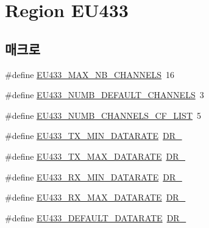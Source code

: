 \hypertarget{group___r_e_g_i_o_n_e_u433}{}\section{Region E\+U433}
\label{group___r_e_g_i_o_n_e_u433}
\subsection*{매크로}
\begin{DoxyCompactItemize}
\item 
\#define \mbox{\hyperlink{group___r_e_g_i_o_n_e_u433_ga800fbd07b871c93758364a0311b87937}{E\+U433\+\_\+\+M\+A\+X\+\_\+\+N\+B\+\_\+\+C\+H\+A\+N\+N\+E\+LS}}~16
\item 
\#define \mbox{\hyperlink{group___r_e_g_i_o_n_e_u433_ga5458d9fd6043a733e6a28f5f30ace167}{E\+U433\+\_\+\+N\+U\+M\+B\+\_\+\+D\+E\+F\+A\+U\+L\+T\+\_\+\+C\+H\+A\+N\+N\+E\+LS}}~3
\item 
\#define \mbox{\hyperlink{group___r_e_g_i_o_n_e_u433_ga97fb06ddf8a39eba531d145336aa7b5f}{E\+U433\+\_\+\+N\+U\+M\+B\+\_\+\+C\+H\+A\+N\+N\+E\+L\+S\+\_\+\+C\+F\+\_\+\+L\+I\+ST}}~5
\item 
\#define \mbox{\hyperlink{group___r_e_g_i_o_n_e_u433_ga800fe5b0107ad06f0938c226022b436b}{E\+U433\+\_\+\+T\+X\+\_\+\+M\+I\+N\+\_\+\+D\+A\+T\+A\+R\+A\+TE}}~\mbox{\hyperlink{group___r_e_g_i_o_n_ga6c4ef966b4f3d5eb7597b087f2b97095}{D\+R\+\_}}
\item 
\#define \mbox{\hyperlink{group___r_e_g_i_o_n_e_u433_gab53c26fec08fdd51e56cb0c4344f3fe9}{E\+U433\+\_\+\+T\+X\+\_\+\+M\+A\+X\+\_\+\+D\+A\+T\+A\+R\+A\+TE}}~\mbox{\hyperlink{group___r_e_g_i_o_n_ga3a06805baf4f00911a3a5d3dbadebf61}{D\+R\+\_}}
\item 
\#define \mbox{\hyperlink{group___r_e_g_i_o_n_e_u433_ga895971124c9b602ce25f611d37df78a3}{E\+U433\+\_\+\+R\+X\+\_\+\+M\+I\+N\+\_\+\+D\+A\+T\+A\+R\+A\+TE}}~\mbox{\hyperlink{group___r_e_g_i_o_n_ga6c4ef966b4f3d5eb7597b087f2b97095}{D\+R\+\_}}
\item 
\#define \mbox{\hyperlink{group___r_e_g_i_o_n_e_u433_ga565b799e9b0922806ddf14fa8518a51b}{E\+U433\+\_\+\+R\+X\+\_\+\+M\+A\+X\+\_\+\+D\+A\+T\+A\+R\+A\+TE}}~\mbox{\hyperlink{group___r_e_g_i_o_n_ga3a06805baf4f00911a3a5d3dbadebf61}{D\+R\+\_}}
\item 
\#define \mbox{\hyperlink{group___r_e_g_i_o_n_e_u433_gaef579f3b753e8be08c36bd3da13a75a8}{E\+U433\+\_\+\+D\+E\+F\+A\+U\+L\+T\+\_\+\+D\+A\+T\+A\+R\+A\+TE}}~\mbox{\hyperlink{group___r_e_g_i_o_n_ga6c4ef966b4f3d5eb7597b087f2b97095}{D\+R\+\_}}

\end{DoxyCompactItemize}
